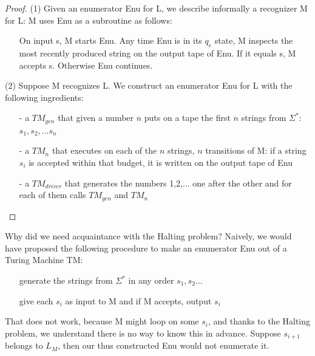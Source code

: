 \begin{proof}
(1) Given an enumerator Enu for L, we describe informally a recognizer
  M for L: M uses Enu as a subroutine as follows:
\begin{itemize}
\item[]
On input s, M starts Enu. Any time Enu is in its $q_e$ state, M
inspects the most recently produced string on the output tape of
Enu. If it equals s, M accepts s. Otherwise Enu continues.
\end{itemize}

(2) Suppose M recognizes L. We construct an enumerator Enu for L with the following ingredients:

\begin{itemize}
\item[-] 
a $TM_{gen}$ that given a number $n$ puts on a tape the first $n$
strings from $\Sigma^*$: $s_1, s_2, ... s_n$

\item[-]
a $TM_n$ that executes on each of the $n$ strings, $n$ transitions
of M: if a string $s_i$ is accepted within that budget, it is written
on the output tape of Enu

\item[-]
a $TM_{driver}$ that generates the numbers 1,2,... one after the
other and for each of them calls $TM_{gen}$ and $TM_n$

\end{itemize}

\end{proof}

Why did we need acquaintance with the Halting problem? Naively, we
would have proposed the following procedure to make an enumerator Enu
out of a Turing Machine TM:

\begin{itemize}
\item[]
generate the strings from $\Sigma^*$ in any order
$s_1, s_2...$

\item[]
give each $s_i$ as input to M and if M accepts, output $s_i$
\end{itemize}

That does not work, because M might loop on some $s_i$, and thanks to
the Halting problem, we understand there is no way to know this in
advance. Suppose $s_{i+1}$ belongs to $L_M$, then our thus constructed
Enu would not enumerate it.


